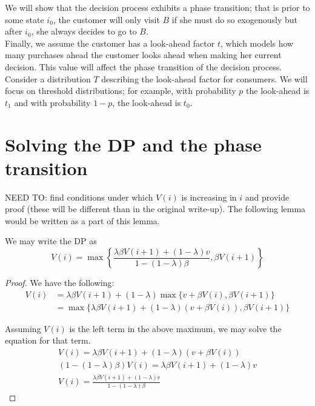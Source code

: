 \documentclass[12pt, a4paper]{article}
\begin{document}
We will show that the decision process exhibits a phase transition; that is prior to some state $i_0$, the customer will only visit $B$ if she must do so exogenously but after $i_0$, she always decides to go to $B$. \\

Finally, we assume the customer has a look-ahead factor $t$, which models how many purchases ahead the customer looks ahead when making her current decision. This value will affect the phase transition of the decision process. Consider a distribution $T$ describing the look-ahead factor for consumers. We will focus on threshold distributions; for example, with probability $p$ the look-ahead is $t_1$ and with probability $1-p$, the look-ahead is $t_0$.

\section{Solving the DP and the phase transition}

NEED TO: find conditions under which $V(i)$ is increasing in $i$ and provide proof (these will be different than in the original write-up). The following lemma would be written as a part of this lemma. \\

\begin{lemma} We may write the DP as
\begin{equation*}
V(i) = \max\left\{ \frac{\lambda \beta V(i+1)+(1-\lambda)v}{1-(1-\lambda)\beta}, \beta V(i+1) \right\}
\end{equation*}
\end{lemma}

\begin{proof}
We have the following:
\begin{align*}
V(i) &= \lambda \beta V(i+1) + (1-\lambda)\max\{v +\beta V(i), \beta V(i+1) \} \\
&= \max\{\lambda \beta V(i+1) + (1-\lambda)(v+\beta V(i)), \beta V(i+1) \}
\end{align*}

Assuming $V(i)$ is the left term in the above maximum, we may solve the equation for that term.
\begin{gather*}
V(i) = \lambda \beta V(i+1) + (1-\lambda)(v+\beta V(i)) \\
(1-(1-\lambda)\beta) V(i) = \lambda \beta V(i+1) + (1-\lambda)v \\
V(i) = \frac{\lambda \beta V(i+1) + (1-\lambda)v}{1-(1-\lambda)\beta}
\end{gather*}\end{proof}
\end{document}
